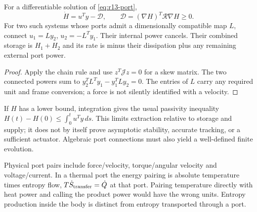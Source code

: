 \begin{proposition}
For a differentiable solution of \eqref{eq:r13-port},
\begin{equation}
 \dot H=u^Ty-\mathcal D,\qquad
 \mathcal D=(\nabla H)^T\mathcal R\nabla H\ge0 .
 \label{eq:r13-power}
\end{equation}
For two such systems whose ports admit a dimensionally compatible map $L$,
connect $u_1=Ly_2$, $u_2=-L^Ty_1$. Their internal power cancels.
Their combined storage is
$H_1+H_2$ and its rate is minus their dissipation plus any remaining external
port power.
\end{proposition}
\begin{proof}
Apply the chain rule and use $z^T\mathcal Jz=0$ for a skew matrix.
The two connected powers sum to $y_2^TL^Ty_1-y_1^TLy_2=0$.
The entries of $L$ carry any required unit and
frame conversion; a force is not silently identified with a velocity.
\end{proof}
If $H$ has a lower bound, integration gives the usual passivity inequality
$H(t)-H(0)\le\int_0^t u^Ty\,ds$.
This limits extraction relative to storage and supply; it does not by itself
prove asymptotic stability, accurate tracking, or a sufficient actuator.
Algebraic port connections must also yield a well-defined finite evolution.

Physical port pairs include force/velocity, torque/angular velocity and
voltage/current. In a thermal port the energy pairing is absolute temperature
times entropy flow, $T\dot S_{\rm transfer}=\dot Q$ at that port. Pairing
temperature directly with heat power and calling the product power would
have the wrong units. Entropy production inside the body is distinct from
entropy transported through a port.

